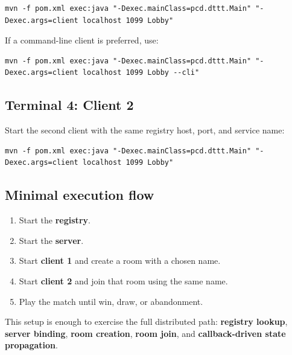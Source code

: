 \begin{lstlisting}[style=codestyle]
mvn -f pom.xml exec:java "-Dexec.mainClass=pcd.dttt.Main" "-Dexec.args=client localhost 1099 Lobby"
\end{lstlisting}

If a command-line client is preferred, use:

\begin{lstlisting}[style=codestyle]
mvn -f pom.xml exec:java "-Dexec.mainClass=pcd.dttt.Main" "-Dexec.args=client localhost 1099 Lobby --cli"
\end{lstlisting}

\subsection{Terminal 4: Client 2}

Start the second client with the same registry host, port, and service name:

\begin{lstlisting}[style=codestyle]
mvn -f pom.xml exec:java "-Dexec.mainClass=pcd.dttt.Main" "-Dexec.args=client localhost 1099 Lobby"
\end{lstlisting}

\subsection{Minimal execution flow}

\begin{enumerate}
    \item Start the \textbf{registry}.
    \item Start the \textbf{server}.
    \item Start \textbf{client 1} and create a room with a chosen name.
    \item Start \textbf{client 2} and join that room using the same name.
    \item Play the match until win, draw, or abandonment.
\end{enumerate}

This setup is enough to exercise the full distributed path:
\textbf{registry lookup}, \textbf{server binding}, \textbf{room creation},
\textbf{room join}, and \textbf{callback-driven state propagation}.
